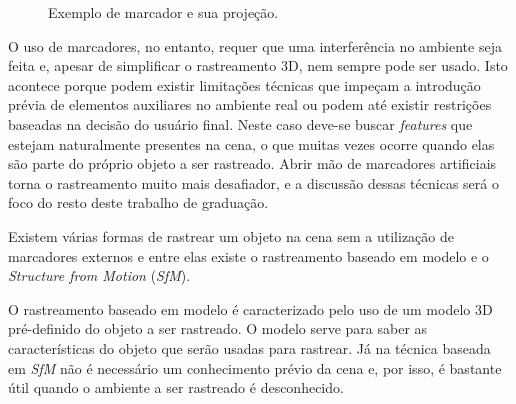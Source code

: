 \begin{figure}[!ht]
	\centerline{
		\hfil
	}
	\caption{Exemplo de marcador e sua projeção.}
\end{figure}

O uso de marcadores, no entanto, requer que uma interferência no ambiente seja feita e, apesar de simplificar o rastreamento 3D, nem sempre pode ser usado. Isto acontece porque podem existir limitações técnicas que impeçam a introdução prévia de elementos auxiliares no ambiente real ou podem até existir restrições baseadas na decisão do usuário final. Neste caso deve-se buscar \emph{features} que estejam naturalmente presentes na cena, o que muitas vezes ocorre quando elas são parte do próprio objeto a ser rastreado. Abrir mão de marcadores artificiais torna o rastreamento muito mais desafiador, e a discussão dessas técnicas será o foco do resto deste trabalho de graduação.

Existem várias formas de rastrear um objeto na cena sem a utilização de marcadores externos \cite{lima2010model} e entre elas existe o rastreamento baseado em modelo e o \emph{Structure from Motion} (\emph{SfM}).

O rastreamento baseado em modelo é caracterizado pelo uso de um modelo 3D pré-definido do objeto a ser rastreado. O modelo serve para saber as características do objeto que serão usadas para rastrear. Já na técnica baseada em \emph{SfM} \cite{lima2010model} não é necessário um conhecimento prévio da cena e, por isso, é bastante útil quando o ambiente a ser rastreado é desconhecido.

